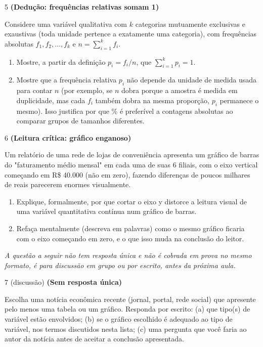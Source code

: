 \documentclass[11pt]{article}
\begin{document}
\begin{questao}{5} \textbf{(Dedução: frequências relativas somam 1)}

Considere uma variável qualitativa com $k$ categorias mutuamente exclusivas e exaustivas (toda
unidade pertence a exatamente uma categoria), com frequências absolutas $f_1, f_2, \ldots, f_k$ e
$n = \sum_{i=1}^k f_i$.

\begin{enumerate}[label=(\alph*)]
  \item Mostre, a partir da definição $p_i = f_i/n$, que $\sum_{i=1}^k p_i = 1$.
  \item Mostre que a frequência relativa $p_i$ não depende da unidade de medida usada para contar
    $n$ (por exemplo, se $n$ dobra porque a amostra é medida em duplicidade, mas cada $f_i$ também
    dobra na mesma proporção, $p_i$ permanece o mesmo). Isso justifica por que \% é preferível a
    contagens absolutas ao comparar grupos de tamanhos diferentes.
\end{enumerate}
\end{questao}

\begin{questao}{6} \textbf{(Leitura crítica: gráfico enganoso)}

Um relatório de uma rede de lojas de conveniência apresenta um gráfico de barras do "faturamento
médio mensal" em cada uma de suas 6 filiais, com o eixo vertical começando em R\$ 40.000 (não em
zero), fazendo diferenças de poucos milhares de reais parecerem enormes visualmente.

\begin{enumerate}[label=(\alph*)]
  \item Explique, formalmente, por que cortar o eixo y distorce a leitura visual de uma variável
    quantitativa contínua num gráfico de barras.
  \item Refaça mentalmente (descreva em palavras) como o mesmo gráfico ficaria com o eixo
    começando em zero, e o que isso muda na conclusão do leitor.
\end{enumerate}
\end{questao}

\bigskip
\noindent\textit{A questão a seguir não tem resposta única e não é cobrada em prova no mesmo
formato, é para discussão em grupo ou por escrito, antes da próxima aula.}

\begin{questao}{7 (discussão)} \textbf{(Sem resposta única)}

Escolha uma notícia econômica recente (jornal, portal, rede social) que apresente pelo menos uma
tabela ou um gráfico. Responda por escrito: (a) que tipo(s) de variável estão envolvidos; (b) se o
gráfico escolhido é adequado ao tipo de variável, nos termos discutidos nesta lista; (c) uma
pergunta que você faria ao autor da notícia antes de aceitar a conclusão apresentada.
\end{questao}
\end{document}
